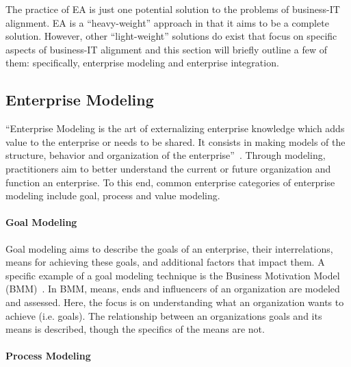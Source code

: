 The practice of EA is just one potential solution to the problems of business-IT alignment. EA is a ``heavy-weight'' approach in that it aims to be a complete solution. However, other ``light-weight'' solutions do exist that focus on specific aspects of business-IT alignment and this section will briefly outline a few of them: specifically, enterprise modeling and enterprise integration. 
  
\subsection{Enterprise Modeling}

``Enterprise Modeling is the art of externalizing enterprise knowledge which adds value to the enterprise or needs to be shared. It consists in making models of the structure, behavior and organization of the enterprise''~\cite{Vernadat200215}. Through modeling, practitioners aim to better understand the current or future organization and function an enterprise. To this end, common enterprise categories of enterprise modeling include goal, process and value modeling. 

\paragraph*{Goal Modeling}

Goal modeling aims to describe the goals of an enterprise, their interrelations, means for achieving these goals, and additional factors that impact them. A specific example of a goal modeling technique is the Business Motivation Model (BMM)~\cite{bmm2010}. In BMM, means, ends and influencers of an organization are modeled and assessed. Here, the focus is on understanding what an organization wants to achieve (i.e. goals). The relationship between an organizations goals and its means is described, though the specifics of the means are not. 

\paragraph*{Process Modeling}


